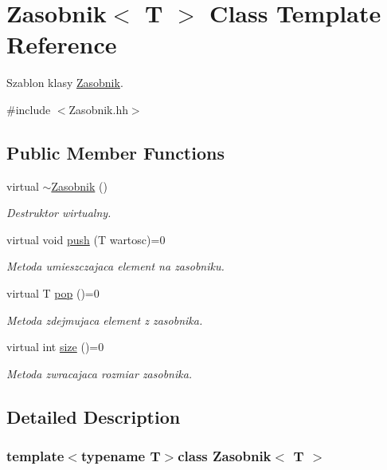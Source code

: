 \hypertarget{a00017}{}\section{Zasobnik$<$ T $>$ Class Template Reference}
\label{a00017}


Szablon klasy \hyperlink{a00017}{Zasobnik}.  




{\ttfamily \#include $<$Zasobnik.\+hh$>$}

\subsection*{Public Member Functions}
\begin{DoxyCompactItemize}
\item 
virtual \hyperlink{a00017_ab8d4ec71166fd24d7e717cc35808fe5d}{$\sim$\+Zasobnik} ()
\begin{DoxyCompactList}\small\item\em Destruktor wirtualny. \end{DoxyCompactList}\item 
virtual void \hyperlink{a00017_a2d4e12285da6c0772a56d70cd90ca436}{push} (T wartosc)=0
\begin{DoxyCompactList}\small\item\em Metoda umieszczajaca element na zasobniku. \end{DoxyCompactList}\item 
virtual T \hyperlink{a00017_a6c4f8b78dd20289be7d1625bcd48e899}{pop} ()=0
\begin{DoxyCompactList}\small\item\em Metoda zdejmujaca element z zasobnika. \end{DoxyCompactList}\item 
virtual int \hyperlink{a00017_aeddc93b1e43aab6f59a60612bf42ed50}{size} ()=0
\begin{DoxyCompactList}\small\item\em Metoda zwracajaca rozmiar zasobnika. \end{DoxyCompactList}\end{DoxyCompactItemize}


\subsection{Detailed Description}
\subsubsection*{template$<$typename T$>$class Zasobnik$<$ T $>$}

